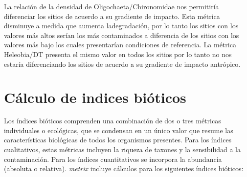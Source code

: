 \documentclass[
]{book}
\begin{document}
La relación de la densidad de Oligochaeta/Chironomidae nos permitiría diferenciar los sitios de acuerdo a su gradiente de impacto.
Esta métrica disminuye a medida que aumenta ladegradación, por lo tanto los sitios con los valores más altos serían los más contaminados a diferencia de los sitios con los valores más bajo los cuales presentarían condiciones de referencia.
La métrica Heleobia/DT presenta el mismo valor en todos los sitios por lo tanto no nos estaría diferenciando los sitios de acuerdo a su gradiente de impacto antrópico.

\hypertarget{cuxe1lculo-de-indices-biuxf3ticos}{%
\section{Cálculo de indices bióticos}\label{cuxe1lculo-de-indices-biuxf3ticos}}

Los índices bióticos comprenden una combinación de dos o tres métricas individuales o ecológicas, que se condensan en un único valor que resume las características biológicas de todos los organismos presentes.
Para los índices cualitativos, estas métricas incluyen la riqueza de taxones y la sensibilidad a la contaminación.
Para los índices cuantitativos se incorpora la abundancia (absoluta o relativa).
\emph{metrix} incluye cálculos para los siguientes índices bióticos:
\end{document}
